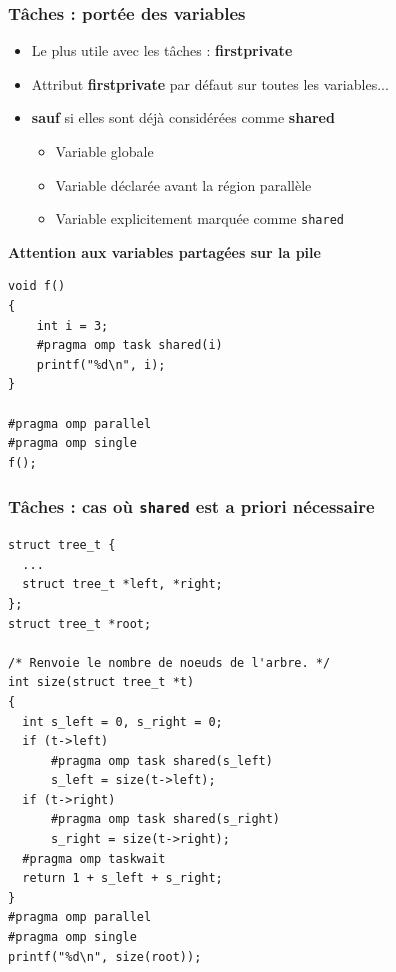 \documentclass{beamer}
\begin{document}

\begin{frame}[fragile]
  \frametitle{Tâches : portée des variables}

  \begin{itemize}
  \item Le plus utile avec les tâches : \textbf{firstprivate}
  \item Attribut \textbf{firstprivate} par défaut sur toutes les variables...
  \item  \alert{\bf sauf} si elles sont déjà considérées comme \textbf{shared}
    \begin{itemize}
    \item Variable globale
    \item Variable déclarée avant la région parallèle
    \item Variable explicitement marquée comme \texttt{shared}
    \end{itemize}
  \end{itemize}

  \begin{alertblock}{\bf Attention aux variables partagées sur la pile}
\begin{verbatim}
void f()
{
    int i = 3;
    #pragma omp task shared(i)
    printf("%d\n", i);
}

#pragma omp parallel
#pragma omp single
f();
\end{verbatim}
  \end{alertblock}
\end{frame}


\begin{frame}[fragile]
  \frametitle{Tâches : cas où \texttt{shared} est a priori nécessaire}

\begin{verbatim}
struct tree_t {
  ...
  struct tree_t *left, *right;
};
struct tree_t *root;

/* Renvoie le nombre de noeuds de l'arbre. */
int size(struct tree_t *t)
{
  int s_left = 0, s_right = 0;
  if (t->left)
      #pragma omp task shared(s_left)
      s_left = size(t->left);
  if (t->right) 
      #pragma omp task shared(s_right)
      s_right = size(t->right);
  #pragma omp taskwait
  return 1 + s_left + s_right;
}
#pragma omp parallel
#pragma omp single
printf("%d\n", size(root));
\end{verbatim}
\end{frame}
\end{document}
